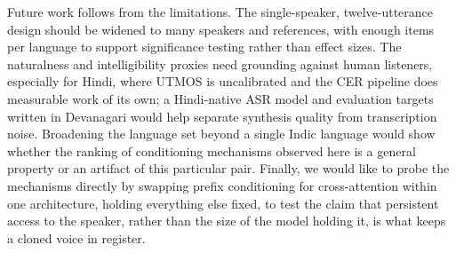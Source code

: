 \documentclass[conference]{IEEEtran}
\begin{document}
Future work follows from the limitations. The single-speaker,
twelve-utterance design should be widened to many speakers and references,
with enough items per language to support significance testing rather than
effect sizes. The naturalness and intelligibility proxies need grounding
against human listeners, especially for Hindi, where UTMOS is uncalibrated
and the CER pipeline does measurable work of its own; a Hindi-native ASR
model and evaluation targets written in Devanagari would help separate
synthesis quality from transcription noise. Broadening the language set
beyond a single Indic language would show whether the ranking of conditioning
mechanisms observed here is a general property or an artifact of this
particular pair. Finally, we would like to probe the mechanisms directly by
swapping prefix conditioning for cross-attention within one architecture,
holding everything else fixed, to test the claim that persistent access to
the speaker, rather than the size of the model holding it, is what keeps a
cloned voice in register.



\end{document}
